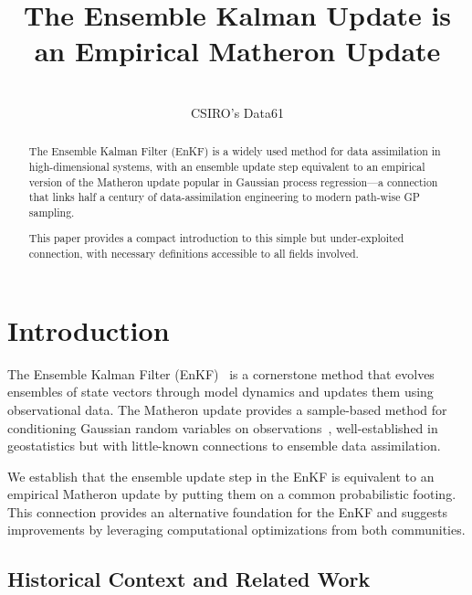\documentclass[wcp]{jmlr} %
\title[Ensemble Kalman Update]{The Ensemble Kalman Update is an Empirical Matheron Update}
\author{\Name{Dan MacKinlay\,\orcidlink{0000-0001-6077-2684}}\\
  \addr CSIRO's Data61}
\begin{document}
\maketitle

\begin{abstract}
The Ensemble Kalman Filter (EnKF) is a widely used method for data assimilation in high-dimensional systems, with an ensemble update step equivalent to an empirical version of the Matheron update popular in Gaussian process regression—a connection that links half a century of data-assimilation engineering to modern path-wise GP sampling.

This paper provides a compact introduction to this simple but under-exploited connection, with necessary definitions accessible to all fields involved.
\end{abstract}


\section{Introduction}

The Ensemble Kalman Filter (EnKF)~\cite{Evensen2003Ensemble,Evensen2009Data} is a cornerstone method that evolves ensembles of state vectors through model dynamics and updates them using observational data. The Matheron update provides a sample-based method for conditioning Gaussian random variables on observations~\cite{Doucet2010Note,Wilson2020Efficiently,Wilson2021Pathwise}, well-established in geostatistics but with little-known connections to ensemble data assimilation.

We establish that the ensemble update step in the EnKF is equivalent to an empirical Matheron update by putting them on a common probabilistic footing. This connection provides an alternative foundation for the EnKF and suggests improvements by leveraging computational optimizations from both communities.

\subsection{Historical Context and Related Work}\label{sec:history}
\end{document}
